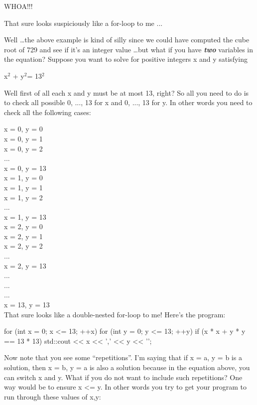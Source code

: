 \begin{console}
WHOA!!!

That sure looks suspiciously like a for-loop to me ...

Well \ldots the above example is kind of silly since we could have
computed the cube root of 729 and see if it's an integer
value \ldots but what if you have \textit{\textbf{two}} variables in the
equation? Suppose you want to solve for positive integers x and y
satisfying

\begin{center}
x$^{2}$ + y$^{2}$= 13$^{2}$
\end{center}

Well first of all each x and y must be at most 13, right? So all you
need to do is to check all possible 0, ..., 13 for x and 0, ..., 13 for
y. In other words you need to check all the following cases:

x = 0, y = 0\\
x = 0, y = 1\\
x = 0, y = 2\\
...\\
x = 0, y = 13\\
x = 1, y = 0\\
x = 1, y = 1\\
x = 1, y = 2\\
...\\
x = 1, y = 13\\
x = 2, y = 0\\
x = 2, y = 1\\
x = 2, y = 2\\
...\\
x = 2, y = 13\\
...\\
...\\
...\\
x = 13, y = 13\\

That sure looks like a double-nested for-loop to me!
Here's the program:
\begin{console}
for (int x = 0; x <= 13; ++x)
{   
    for (int y = 0; y <= 13; ++y)
    {
        if (x * x + y * y == 13 * 13)
        {  
           std::cout << x << ',' << y << '\n';
        }
    }
}
\end{console}
Now note that you see some ``repetitions''. I'm saying
that if x = a, y = b is a solution, then x = b, y = a is also a solution
because in the equation above, you can switch x and y. What if you do
not want to include such repetitions? One way would be to ensure x
<= y. In other words you try to get your program to run through
these values of x,y:


\end{console}
